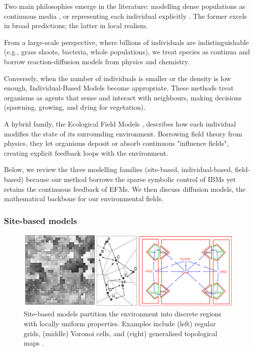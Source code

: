 Two main philosophies emerge in the literature: modelling dense populations as continuous media \cite{Turing1952}, or representing each individual explicitly \cite{Czaran1998}. The former excels in broad predictions; the latter in local realism.

From a large-scale perspective, where billions of individuals are indistinguishable (e.g., grass shoots, bacteria, whole populations), we treat species as continua and borrow reaction-diffusion models from physics and chemistry.

Conversely, when the number of individuals is smaller or the density is low enough, Individual-Based Models become appropriate. These methods treat organisms as agents that sense and interact with neighbours, making decisions (spawning, growing, and dying for vegetation).

A hybrid family, the Ecological Field Models \cite{Wu1985}, describes how each individual modifies the state of its surrounding environment. Borrowing field theory from physics, they let organisms deposit or absorb continuous "influence fields", creating explicit feedback loops with the environment.

Below, we review the three modelling families (site-based, individual-based, field-based) because our method borrows the sparse symbolic control of IBMs yet retains the continuous feedback of EFMs. We then discuss diffusion models, the mathematical backbone for our environmental fields.

\subsubsection{Site-based models}

\begin{figure}
    \includegraphics[width=.8\linewidth]{grid-based-modeling-teaser.png}
    \caption{Site-based models partition the environment into discrete regions with locally uniform properties. Examples include (left) regular grids, (middle) Voronoi cells, and (right) generalised topological maps \cite{Nelson2012,Lemiere2023}.}
    \label{fig:env-obj-grid-based-models}
\end{figure}


